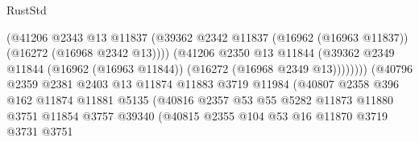 \begin{lexlean}{RustStd}
\begin{coremodule}
                                          (@41206
                                            @2343
                                            @13
                                            @11837
                                            (@39362
                                              @2342
                                              @11837
                                              (@16962 (@16963 @11837))
                                              (@16272 (@16968 @2342 @13))))
                                          (@41206
                                            @2350
                                            @13
                                            @11844
                                            (@39362
                                              @2349
                                              @11844
                                              (@16962 (@16963 @11844))
                                              (@16272 (@16968 @2349 @13))))))))
                                  (@40796
                                    @2359
                                    @2381
                                    @2403
                                    @13
                                    @11874
                                    @11883
                                    @3719
                                    @11984
                                    (@40807
                                      @2358
                                      @396
                                      @162
                                      @11874
                                      @11881
                                      @5135
                                      (@40816
                                        @2357
                                        @53
                                        @55
                                        @5282
                                        @11873
                                        @11880
                                        @3751
                                        @11854
                                        @3757
                                        @39340
                                        (@40815
                                          @2355
                                          @104
                                          @53
                                          @16
                                          @11870
                                          @3719
                                          @3731
                                          @3751

\end{coremodule}
\end{lexlean}
